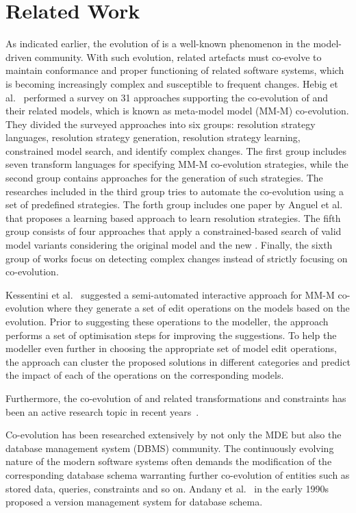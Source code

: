 \section{Related Work} \label{sec:RW}

As indicated earlier, the evolution of \metamodels is a well-known phenomenon in the model-driven community. With such evolution, related artefacts must co-evolve to maintain conformance and proper functioning of related software systems, which is becoming increasingly complex and susceptible to frequent changes. Hebig et al.~\autocite{Hebig2017} performed a survey on 31 approaches supporting the co-evolution of \metamodels and their related models, which is known as meta-model model (MM-M) co-evolution. They divided the surveyed approaches into six groups: resolution strategy languages, resolution strategy generation, resolution strategy learning, constrained model search, and identify complex changes. The first group includes seven transform languages for specifying MM-M co-evolution strategies, while the second group contains approaches for the generation of such strategies. The researches included in the third group tries to automate the co-evolution using a set of predefined strategies. The forth group includes one paper by Anguel et al.~\autocite{Anguel2013} that proposes a learning based approach to learn resolution strategies. The fifth group consists of four approaches that apply a constrained-based search of valid model variants considering the original model and the new \metamodel. Finally, the sixth group of works focus on detecting complex \metamodel changes instead of strictly focusing on co-evolution.

Kessentini et al.~\autocite{Kessentini2022} suggested a semi-automated interactive approach for MM-M co-evolution where they generate a set of edit operations on the models based on the \metamodel evolution. Prior to suggesting these operations to the modeller, the approach performs a set of optimisation steps for improving the suggestions. To help the modeller even further in choosing the appropriate set of model edit operations, the approach can cluster the proposed solutions in different categories and predict the impact of each of the operations on the corresponding models.

Furthermore, the co-evolution of \metamodel and related transformations and constraints has been an active research topic in recent years~\autocite{Kusel2015, Khelladi2017, garcia2013}.

Co-evolution has been researched extensively by not only the MDE but also the database management system (DBMS) community. The continuously evolving nature of the modern software systems often demands the modification of the corresponding database schema warranting further co-evolution of entities such as stored data, queries, constraints and so on. Andany et al.~\autocite{andany1991management} in the early 1990s proposed a version management system for database schema. 

\autocite{younggook2005, HICK2006534, curino2010, Curino2008}


